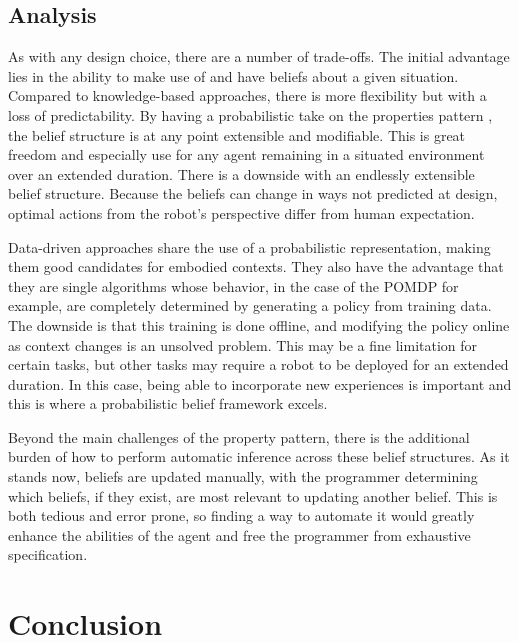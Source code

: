 \documentclass[12pt]{article}
\begin{document}
\subsection{Analysis}
\label{sec:analysis}
As with any design choice, there are a number of trade-offs. The
initial advantage lies in the ability to make use of and have beliefs
about a given situation.  Compared to knowledge-based approaches,
there is more flexibility but with a loss of predictability. By having
a probabilistic take on the properties pattern \cite{Fowler}, the
belief structure is at any point extensible and modifiable. This is
great freedom and especially use for any agent remaining in a situated
environment over an extended duration.  There is a downside with an
endlessly extensible belief structure. Because the beliefs can change
in ways not predicted at design, optimal actions from the robot's
perspective differ from human expectation.

Data-driven approaches share the use of a probabilistic
representation, making them good candidates for embodied
contexts. They also have the advantage that they are single algorithms
whose behavior, in the case of the POMDP for example, are completely
determined by generating a policy from training data. The downside is
that this training is done offline, and modifying the policy online as
context changes is an unsolved problem. This may be a fine limitation
for certain tasks, but other tasks may require a robot to be deployed
for an extended duration. In this case, being able to incorporate new
experiences is important and this is where a probabilistic belief
framework excels.

Beyond the main challenges of the property pattern, there is the
additional burden of how to perform automatic inference across these
belief structures. As it stands now, beliefs are updated manually,
with the programmer determining which beliefs, if they exist, are most
relevant to updating another belief. This is both tedious and error
prone, so finding a way to automate it would greatly enhance the
abilities of the agent and free the programmer from exhaustive
specification.

\section{Conclusion}
\label{sec:conclusion}
\end{document}

